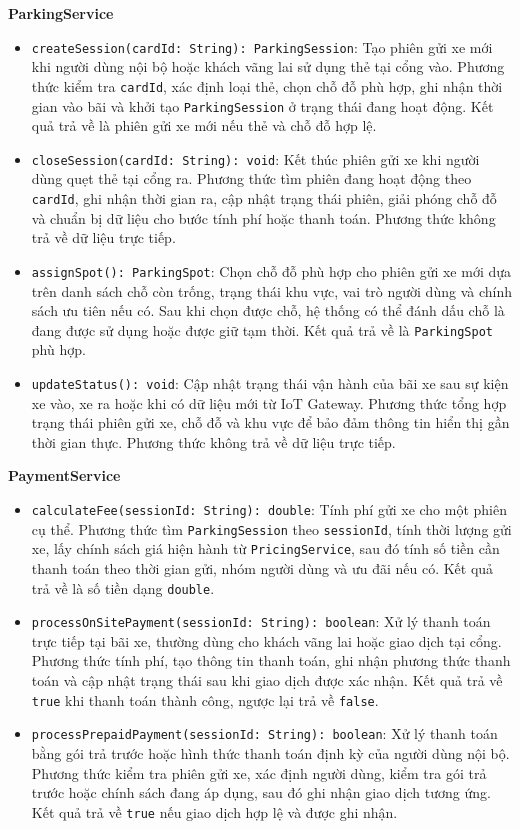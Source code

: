 \noindent\textbf{ParkingService}
\begin{itemize}
    \item \texttt{createSession(cardId: String): ParkingSession}: Tạo phiên gửi xe mới khi người dùng nội bộ hoặc khách vãng lai sử dụng thẻ tại cổng vào. Phương thức kiểm tra \texttt{cardId}, xác định loại thẻ, chọn chỗ đỗ phù hợp, ghi nhận thời gian vào bãi và khởi tạo \texttt{ParkingSession} ở trạng thái đang hoạt động. Kết quả trả về là phiên gửi xe mới nếu thẻ và chỗ đỗ hợp lệ.
    \item \texttt{closeSession(cardId: String): void}: Kết thúc phiên gửi xe khi người dùng quẹt thẻ tại cổng ra. Phương thức tìm phiên đang hoạt động theo \texttt{cardId}, ghi nhận thời gian ra, cập nhật trạng thái phiên, giải phóng chỗ đỗ và chuẩn bị dữ liệu cho bước tính phí hoặc thanh toán. Phương thức không trả về dữ liệu trực tiếp.
    \item \texttt{assignSpot(): ParkingSpot}: Chọn chỗ đỗ phù hợp cho phiên gửi xe mới dựa trên danh sách chỗ còn trống, trạng thái khu vực, vai trò người dùng và chính sách ưu tiên nếu có. Sau khi chọn được chỗ, hệ thống có thể đánh dấu chỗ là đang được sử dụng hoặc được giữ tạm thời. Kết quả trả về là \texttt{ParkingSpot} phù hợp.
    \item \texttt{updateStatus(): void}: Cập nhật trạng thái vận hành của bãi xe sau sự kiện xe vào, xe ra hoặc khi có dữ liệu mới từ IoT Gateway. Phương thức tổng hợp trạng thái phiên gửi xe, chỗ đỗ và khu vực để bảo đảm thông tin hiển thị gần thời gian thực. Phương thức không trả về dữ liệu trực tiếp.
\end{itemize}

\noindent\textbf{PaymentService}
\begin{itemize}
    \item \texttt{calculateFee(sessionId: String): double}: Tính phí gửi xe cho một phiên cụ thể. Phương thức tìm \texttt{ParkingSession} theo \texttt{sessionId}, tính thời lượng gửi xe, lấy chính sách giá hiện hành từ \texttt{PricingService}, sau đó tính số tiền cần thanh toán theo thời gian gửi, nhóm người dùng và ưu đãi nếu có. Kết quả trả về là số tiền dạng \texttt{double}.
    \item \texttt{processOnSitePayment(sessionId: String): boolean}: Xử lý thanh toán trực tiếp tại bãi xe, thường dùng cho khách vãng lai hoặc giao dịch tại cổng. Phương thức tính phí, tạo thông tin thanh toán, ghi nhận phương thức thanh toán và cập nhật trạng thái sau khi giao dịch được xác nhận. Kết quả trả về \texttt{true} khi thanh toán thành công, ngược lại trả về \texttt{false}.
    \item \texttt{processPrepaidPayment(sessionId: String): boolean}: Xử lý thanh toán bằng gói trả trước hoặc hình thức thanh toán định kỳ của người dùng nội bộ. Phương thức kiểm tra phiên gửi xe, xác định người dùng, kiểm tra gói trả trước hoặc chính sách đang áp dụng, sau đó ghi nhận giao dịch tương ứng. Kết quả trả về \texttt{true} nếu giao dịch hợp lệ và được ghi nhận.
\end{itemize}

